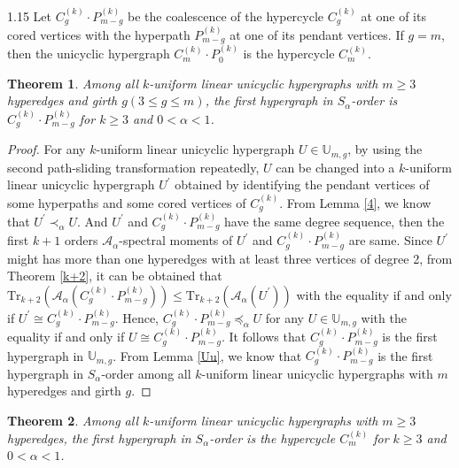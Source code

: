\documentclass[preprint,12pt]{elsarticle1}
\newtheorem{thm}{Theorem}[section]
\numberwithin{equation}{section}
\begin{document}
\begin{spacing}{1.15}
Let $C_{g}^{(k)}\cdot P_{m-g}^{(k)}$ be the coalescence of the hypercycle $C_{g}^{(k)}$ at one of its cored vertices with the hyperpath $P_{m-g}^{(k)}$ at one of its pendant vertices.
If $g=m$, then the unicyclic hypergraph $C_{m}^{(k)}\cdot P_{0}^{(k)}$ is the hypercycle $C_{m}^{(k)}$.

\begin{thm}\label{cgpn-g}
Among all $k$-uniform linear unicyclic hypergraphs with $m\ge3$ hyperedges and girth $g(3\le g\le m)$, the first hypergraph in $S_{\alpha}$-order is $C_{g}^{(k)}\cdot P_{m-g}^{(k)}$ for $k\ge3$ and $0<\alpha<1$.
\end{thm}

\begin{proof}
For any $k$-uniform linear unicyclic hypergraph $U\in\mathbb{U}_{m,g}$, by using the second path-sliding transformation repeatedly, $U$ can be changed into a $k$-uniform linear unicyclic hypergraph $U^{'}$ obtained by identifying the pendant vertices of some hyperpaths and some cored vertices of $C_{g}^{(k)}$.
From Lemma \ref{4}, we know that $U^{'}\prec_{\alpha}U$.
And $U^{'}$ and $C_{g}^{(k)}\cdot P_{m-g}^{(k)}$ have the same degree sequence, then the first $k+1$ orders $\mathcal{A}_{\alpha}$-spectral moments of $U^{'}$ and $C_{g}^{(k)}\cdot P_{m-g}^{(k)}$ are same.
Since $U^{'}$ might has more than one hyperedges with at least three vertices of degree 2,
from Theorem \ref{k+2},
it can be obtained that $\mathrm{Tr}_{k+2}(\mathcal{A}_{\alpha}(C_{g}^{(k)}\cdot P_{m-g}^{(k)}))\le\mathrm{Tr}_{k+2}(\mathcal{A}_{\alpha}(U^{'}))$ with the equality if and only if $U^{'}\cong C_{g}^{(k)}\cdot P_{m-g}^{(k)}$. Hence, $C_{g}^{(k)}\cdot P_{m-g}^{(k)}\preceq_{\alpha}U$ for any $U\in\mathbb{U}_{m,g}$ with the equality if and only if $U\cong C_{g}^{(k)}\cdot P_{m-g}^{(k)}$. It follows that $C_{g}^{(k)}\cdot P_{m-g}^{(k)}$ is the first hypergraph in $\mathbb{U}_{m,g}$. From Lemma \ref{Uu}, we know that $C_{g}^{(k)}\cdot P_{m-g}^{(k)}$ is the first hypergraph in $S_{\alpha}$-order among all $k$-uniform linear unicyclic hypergraphs with $m$ hyperedges and girth $g$.
\end{proof}

\begin{thm}\label{firstcycle}
Among all $k$-uniform linear unicyclic hypergraphs with $m\ge3$ hyperedges, the first hypergraph in $S_{\alpha}$-order is the hypercycle $C_{m}^{(k)}$ for $k\ge3$ and $0<\alpha<1$.
\end{thm}


\end{spacing}
\end{document}
